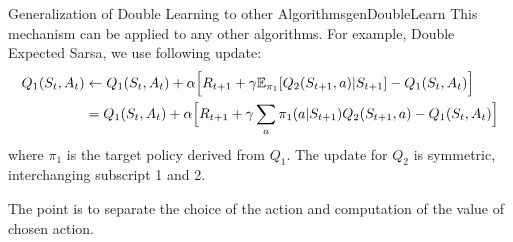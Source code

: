 \documentclass[../../main.tex]{subfiles}
\begin{document}
            \begin{rem}{Generalization of Double Learning to other Algorithms}{genDoubleLearn}
                This mechanism can be applied to any other algorithms.
                For example, Double Expected Sarsa, we use following update:
                \begin{align}
                    Q_1(S_t,A_t)
                    &\leftarrow Q_1(S_t,A_t) + \alpha\Big[ R_{t+1} + \gamma \mathbb{E}_{\pi_1}[Q_2(S_{t+1}, a) | S_{t+1}] - Q_1(S_t,A_t) \Big] \\
                    &= Q_1(S_t,A_t) + \alpha\Big[ R_{t+1} + \gamma \sum_a \pi_1(a|S_{t+1})Q_2(S_{t+1},a) - Q_1(S_t,A_t) \Big]
                \end{align}
                where $\pi_1$ is the target policy derived from $Q_1$. The update for $Q_2$ is symmetric, interchanging subscript 1 and 2.
            \end{rem}
            The point is to separate the choice of the action and computation of the value of chosen action.
\end{document}

